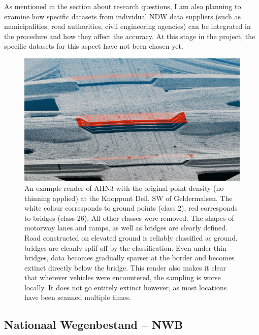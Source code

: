 As mentioned in the section about research questions, I am also planning to examine how specific datasets from individual NDW data suppliers (such as municipalities, road authorities, civil engineering agencies) can be integrated in the procedure and how they affect the accuracy. At this stage in the project, the specific datasets for this aspect have not been chosen yet.

\begin{figure}[hb]
    \centering
    \includegraphics[width=\linewidth]{p2/figs/ahn_sample_01.png} 
    \caption{An example render of AHN3 with the original point density (no thinning applied) at the Knoppunt Deil, SW of Geldermalsen. The white colour corresponds to ground points (class 2), red corresponds to bridges (class 26). All other classes were removed. The shapes of motorway lanes and ramps, as well as bridges are clearly defined. Road constructed on elevated ground is reliably classified as ground, bridges are cleanly splif off by the classification. Even under thin bridges, data becomes gradually sparser at the border and becomes extinct directly below the bridge. This render also makes it clear that wherever vehicles were encountered, the sampling is worse locally. It does not go entirely extinct however, as most locations have been scanned multiple times.}
    \label{fig:ahnbridges}
\end{figure}

\subsection{Nationaal Wegenbestand – NWB}
\label{sub:nwb}

